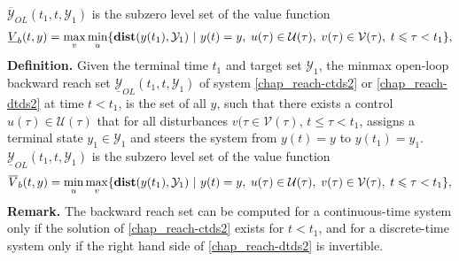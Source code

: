 \documentclass[letterpaper,10pt,english]{sphinxmanual}
\begin{document}
\(\overline{{\mathcal Y}}_{OL}(t_1, t, {\mathcal Y}_1)\) is the
subzero level set of the value function
\label{chap_reach:equation-maxminvfb}\begin{gather}
\begin{split}\begin{aligned}
\underline{V}_b(t, y) = \max_v\min_u\{{\bf dist}(y(t_1), {\mathcal Y}_1) ~|~ y(t)=y, \; u(\tau)\in{\mathcal U}(\tau), \;
v(\tau)\in{\mathcal V}(\tau), \; t\leqslant\tau<t_1\},
\end{aligned}\end{split}\label{chap_reach-maxminvfb}
\end{gather}
\textbf{Definition.} Given the terminal time \(t_1\) and target set
\({\mathcal Y}_1\), the minmax open-loop backward reach set
\(\underline{{\mathcal Y}}_{OL}(t_1, t, {\mathcal Y}_1)\) of system
\eqref{chap_reach-ctds2} or \eqref{chap_reach-dtds2} at time \(t<t_1\), is the set of all \(y\),
such that there exists a control \(u(\tau)\in{\mathcal U}(\tau)\)
that for all disturbances \(v(\tau\in{\mathcal V}(\tau)\),
\(t\leqslant\tau<t_1\), assigns a terminal state
\(y_1\in{\mathcal Y}_1\) and steers the system from \(y(t)=y\)
to \(y(t_1)=y_1\).
\(\underline{{\mathcal Y}}_{OL}(t_1, t, {\mathcal Y}_1)\) is the
subzero level set of the value function
\label{chap_reach:equation-minmaxvfb}\begin{gather}
\begin{split}\begin{aligned}
\overline{V}_b(t, y) = \min_u\max_v\{{\bf dist}(y(t_1), {\mathcal Y}_1) ~|~ y(t)=y, \; u(\tau)\in{\mathcal U}(\tau), \;
v(\tau)\in{\mathcal V}(\tau), \; t\leqslant\tau<t_1\},
\end{aligned}\end{split}\label{chap_reach-minmaxvfb}
\end{gather}
\textbf{Remark.} The backward reach set can be computed for a continuous-time
system only if the solution of \eqref{chap_reach-ctds2} exists for \(t<t_1\), and
for a discrete-time system only if the right hand side of \eqref{chap_reach-dtds2} is
invertible.
\end{document}
